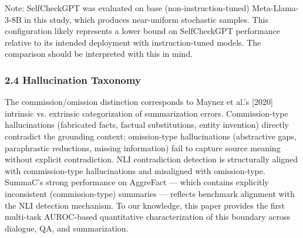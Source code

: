 Note: SelfCheckGPT was evaluated on base (non-instruction-tuned) Meta-Llama-3-8B in this study, which produces near-uniform stochastic samples. This configuration likely represents a lower bound on SelfCheckGPT performance relative to its intended deployment with instruction-tuned models. The comparison should be interpreted with this in mind.

\subsubsection{2.4 Hallucination Taxonomy}

The commission/omission distinction corresponds to Maynez et al.'s [2020] intrinsic vs. extrinsic categorization of summarization errors. Commission-type hallucinations (fabricated facts, factual substitutions, entity invention) directly contradict the grounding context; omission-type hallucinations (abstractive gaps, paraphrastic reductions, missing information) fail to capture source meaning without explicit contradiction. NLI contradiction detection is structurally aligned with commission-type hallucinations and misaligned with omission-type. SummaC's strong performance on AggreFact --- which contains explicitly inconsistent (commission-type) summaries --- reflects benchmark alignment with the NLI detection mechanism. To our knowledge, this paper provides the first multi-task AUROC-based quantitative characterization of this boundary across dialogue, QA, and summarization.

